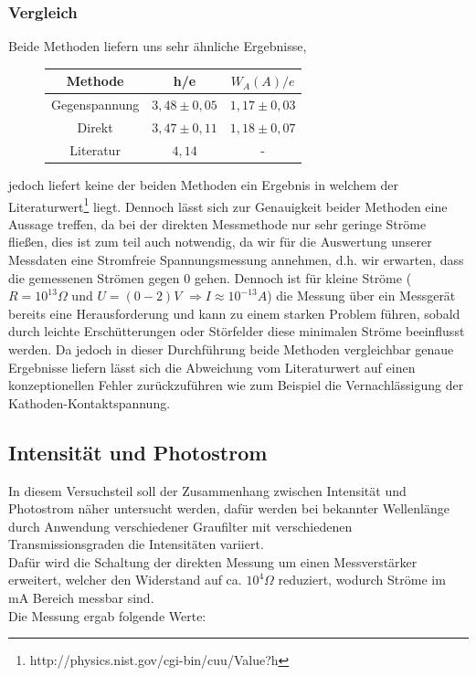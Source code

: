 \documentclass{scrartcl}
\begin{document}
		\subsubsection{Vergleich}
			Beide Methoden liefern uns sehr ähnliche Ergebnisse,
			\begin{figure}[H]
				\centering
				\begin{tabular}{|c|c|c|}
					\hline
					Methode & h/e & $W_A(A)/e$ \\ 
					\hline
					Gegenspannung & $3,48\pm 0,05$ & $1,17\pm 0,03$ \\
					Direkt & $3,47\pm 0,11$ & $1,18\pm 0,07$ \\
					Literatur & $4,14$ & - \\
					\hline
				\end{tabular}
			\end{figure}
			jedoch liefert keine der beiden Methoden ein Ergebnis in welchem der Literaturwert\footnote{http://physics.nist.gov/cgi-bin/cuu/Value?h} liegt. Dennoch lässt sich 
			zur Genauigkeit beider Methoden eine Aussage treffen, da bei der direkten Messmethode nur sehr geringe Ströme fließen, dies ist zum teil auch notwendig,
			da wir für die Auswertung unserer Messdaten eine Stromfreie Spannungsmessung annehmen, d.h. wir erwarten, dass die gemessenen Strömen gegen 0 gehen.
			Dennoch ist für kleine Ströme
			($R=10^{13}\Omega$ und $U=(0-2)V$ $\Rightarrow I\approx 10^{-13}A$) die Messung über ein Messgerät bereits eine Herausforderung
			und kann zu einem starken Problem führen, sobald durch leichte Erschütterungen oder Störfelder diese minimalen Ströme beeinflusst werden.
			Da jedoch in dieser Durchführung beide Methoden vergleichbar genaue Ergebnisse liefern lässt sich die Abweichung vom 
			Literaturwert auf einen konzeptionellen Fehler zurückzuführen wie zum Beispiel die Vernachlässigung der Kathoden-Kontaktspannung.

	\subsection{Intensität und Photostrom}
		In diesem Versuchsteil soll der Zusammenhang zwischen Intensität und Photostrom näher untersucht werden, dafür 
		werden bei bekannter Wellenlänge durch Anwendung verschiedener Graufilter mit verschiedenen Transmissionsgraden
		die Intensitäten variiert.\\
		Dafür wird die Schaltung der direkten Messung um einen Messverstärker erweitert, welcher den Widerstand
		auf ca. $10^4 \Omega$ reduziert, wodurch Ströme im mA Bereich messbar sind.\\
		Die Messung ergab folgende Werte:
		
\end{document}
